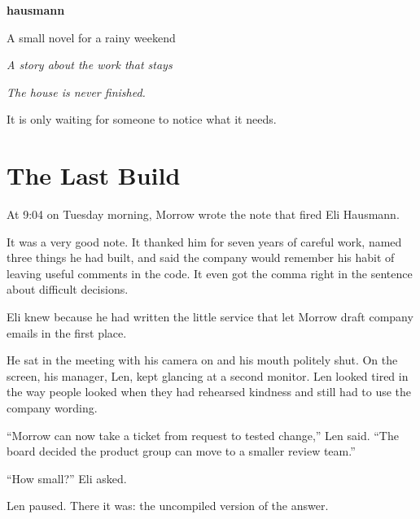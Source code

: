 \documentclass[11pt,openany]{book}
\begin{document}
\begin{titlepage}
\thispagestyle{empty}
\centering
\vspace*{\fill}
{\Huge\bfseries hausmann\par}
\vspace{1.2em}
{\large A small novel for a rainy weekend\par}
\vspace{5em}
{\itshape A story about the work that stays\par}
\vspace*{\fill}
\end{titlepage}

\frontmatter
\thispagestyle{empty}
\vspace*{\fill}
\begin{center}
\itshape
The house is never finished.\par
It is only waiting for someone to notice what it needs.
\end{center}
\vspace*{\fill}
\clearpage

\tableofcontents
\mainmatter

\chapter{The Last Build}

At 9:04 on Tuesday morning, Morrow wrote the note that fired Eli Hausmann.

It was a very good note. It thanked him for seven years of careful work, named three things he had built, and said the company would remember his habit of leaving useful comments in the code. It even got the comma right in the sentence about difficult decisions.

Eli knew because he had written the little service that let Morrow draft company emails in the first place.

He sat in the meeting with his camera on and his mouth politely shut. On the screen, his manager, Len, kept glancing at a second monitor. Len looked tired in the way people looked when they had rehearsed kindness and still had to use the company wording.

``Morrow can now take a ticket from request to tested change,'' Len said. ``The board decided the product group can move to a smaller review team.''

``How small?'' Eli asked.

Len paused. There it was: the uncompiled version of the answer.
\end{document}
